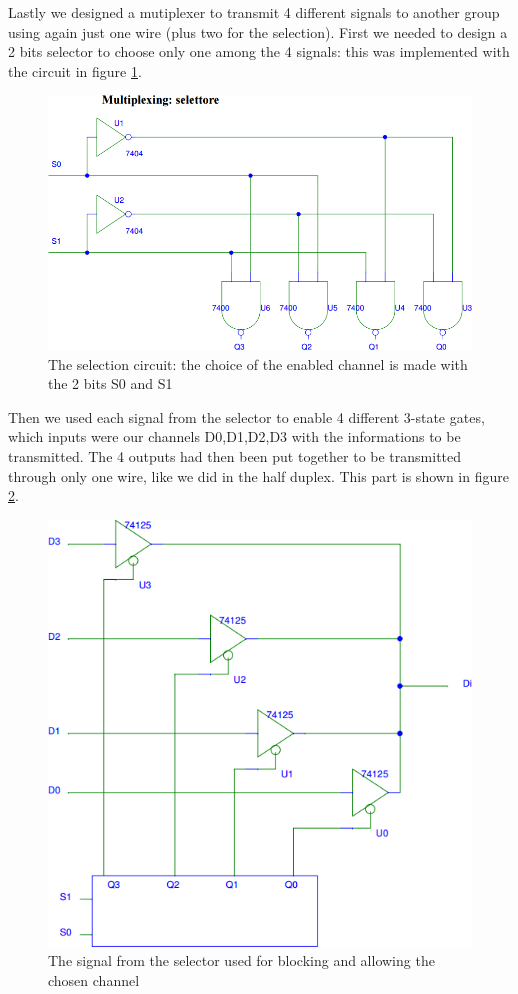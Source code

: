 Lastly we designed a mutiplexer to transmit 4 different signals to another group using again just one wire (plus two for the selection). First we needed to design a 2 bits selector to choose only one among the 4 signals: this was implemented with the circuit in figure \ref{multi_select}.
\begin{figure}[H]
\centering
\includegraphics[width=.7\textwidth]{10/multi_select.png}
\caption{The selection circuit: the choice of the enabled channel is made with the 2 bits S0 and S1}\label{multi_select}
\end{figure}
Then we used each signal from the selector to enable 4 different 3-state gates, which inputs were our channels D0,D1,D2,D3 with the informations to be transmitted. The 4 outputs had then been put together to be transmitted through only one wire, like we did in the half duplex. This part is shown in figure \ref{multi_wired}.
\begin{figure}[H]
\centering
\includegraphics[width=.7\textwidth]{10/multi_wired.png}
\caption{The signal from the selector used for blocking and allowing the chosen channel}\label{multi_wired}
\end{figure}
